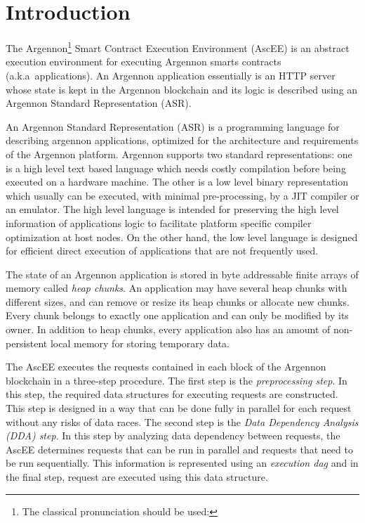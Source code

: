 

\section{Introduction}\label{sec:introduction}

The Argennon\footnote{The classical pronunciation should be used:} Smart Contract Execution
Environment (AscEE) is an abstract execution environment for executing Argennon smarts contracts (a.k.a\ applications).
An Argennon application essentially is an HTTP server whose state is kept in the Argennon blockchain and
its logic is described using an Argennon Standard Representation (ASR).

An Argennon Standard Representation (ASR) is a programming language for describing argennon applications, optimized
for the architecture and requirements of the Argennon platform.
Argennon supports two standard representations: one is a high level text based language which needs
costly compilation before being executed on a hardware machine. The other is a low level binary representation which
usually can be executed, with minimal pre-processing, by a JIT compiler or an emulator. The high level
language is intended for preserving the high level information of applications logic to facilitate
platform specific compiler optimization at host nodes. On the other hand, the low level language is designed for
efficient direct execution of applications that are not frequently used.

The state of an Argennon application is stored in byte addressable finite arrays of memory called
\emph{heap chunks}. An application may have several heap chunks with different sizes, and can remove or
resize its heap chunks or allocate new chunks. Every chunk belongs to exactly one application and can only be modified
by its owner. In addition to heap chunks, every application also has an amount of non-persistent local memory for
storing temporary data.

The AscEE executes the requests contained in each block of the Argennon
blockchain in a three-step procedure. The first step is the \emph{preprocessing step}. In this step, the required
data structures for executing requests are constructed. This step is
designed in a way that can be done fully in parallel for each request without any risks of data races. The second
step is the \emph{Data Dependency Analysis (DDA) step}.
In this step by analyzing data dependency between requests, the AscEE determines requests that can be run in parallel
and requests that need to be run sequentially. This information is represented using an \emph{execution dag} and in
the final step, request are executed using this data structure.


